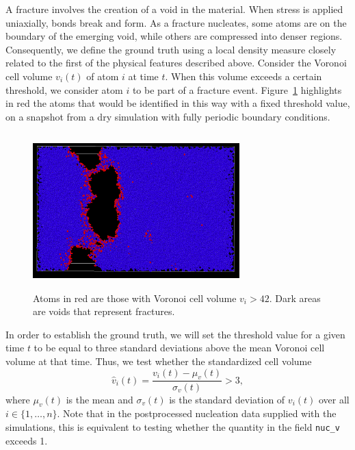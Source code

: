 A fracture involves the creation of a void in the material. When stress is applied uniaxially, bonds break and form.  As a fracture nucleates, some atoms are on the boundary of the emerging void, while others are compressed into denser regions.  Consequently, we define the ground truth using a local density measure closely related to the first of the physical features described above.  Consider the Voronoi cell volume $v_i(t)$ of atom $i$ at time $t$.  When this volume exceeds a certain threshold, we consider atom $i$ to be part of a fracture event.  Figure~\ref{fig:crack_vol} highlights in red the atoms that would be identified in this way with a fixed threshold value, on a snapshot from a dry simulation with fully periodic boundary conditions.

    \begin{figure}
    \centering
    \noindent
    \includegraphics[width=8cm, height=6cm]{picture/volcolor.PNG}
    \caption{Atoms in red are those with Voronoi cell volume $v_i>42$.  Dark areas are voids that represent fractures.}
    \label{fig:crack_vol}
    \end{figure}
    
In order to establish the ground truth, we will set the threshold value for a given time $t$ to be equal to three standard deviations above the mean Voronoi cell volume at that time.  Thus, we test whether the standardized cell volume
    \begin{equation}
    \hat{v}_i(t) = \frac{v_i(t) - \mu_v(t)}{\sigma_v(t)} > 3,
    \end{equation}
where $\mu_v(t)$ is the mean and $\sigma_v(t)$ is the standard deviation of $v_i(t)$ over all $i\in\{1,\dots,n\}$.  Note that in the postprocessed nucleation data supplied with the simulations, this is equivalent to testing whether the quantity in the field {\tt nuc\_v} exceeds 1.

